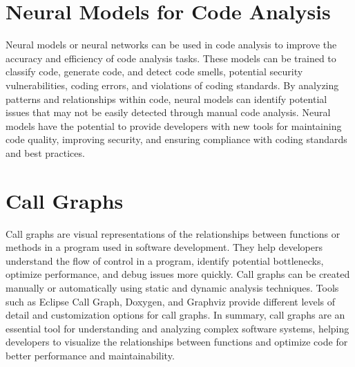 \section{Neural Models for Code Analysis}
Neural models or neural networks can be used in code analysis to improve the accuracy and efficiency of code analysis tasks.
These models can be trained to classify code, generate code, and detect code smells, potential security vulnerabilities, coding errors, and violations of coding standards.
By analyzing patterns and relationships within code, neural models can identify potential issues that may not be easily detected through manual code analysis.
Neural models have the potential to provide developers with new tools for maintaining code quality, improving security, and ensuring compliance with coding standards and best practices.

\section{Call Graphs}
Call graphs are visual representations of the relationships between functions or methods in a program used in software development.
They help developers understand the flow of control in a program, identify potential bottlenecks, optimize performance, and debug issues more quickly.
Call graphs can be created manually or automatically using static and dynamic analysis techniques.
Tools such as Eclipse Call Graph, Doxygen, and Graphviz provide different levels of detail and customization options for call graphs.
In summary, call graphs are an essential tool for understanding and analyzing complex software systems, helping developers to visualize the relationships between functions and optimize code for better performance and maintainability.